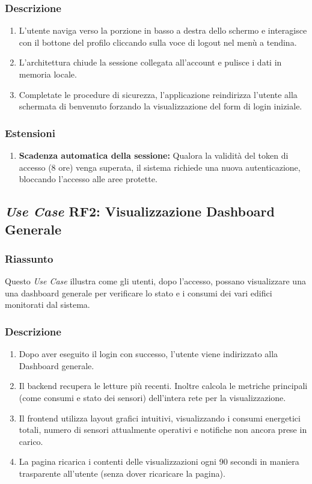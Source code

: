         \subsubsection*{Descrizione}
            \begin{enumerate}
                \item L'utente naviga verso la porzione in basso a  destra dello schermo e interagisce con il bottone del profilo cliccando sulla voce di logout nel menù a tendina.
                \item L'architettura chiude la sessione collegata all'account e pulisce i dati in memoria locale.
                \item Completate le procedure di sicurezza, l'applicazione reindirizza l'utente alla schermata di benvenuto forzando la visualizzazione del form di login iniziale.
            \end{enumerate}
        \subsubsection*{Estensioni}
            \begin{enumerate}
                \item \textbf{Scadenza automatica della sessione:} Qualora la validità del token di accesso (8 ore) venga superata, il sistema richiede una nuova autenticazione, bloccando l'accesso alle aree protette.
            \end{enumerate}
    \subsection*{\textit{Use Case} RF2: Visualizzazione Dashboard Generale}
        \subsubsection*{Riassunto}
            Questo \textit{Use Case} illustra come gli utenti, dopo l'accesso, possano visualizzare una una dashboard generale per verificare lo stato e i consumi dei vari edifici monitorati dal sistema.
        \subsubsection*{Descrizione}
            \begin{enumerate}
                \item Dopo aver eseguito il login con successo, l'utente viene indirizzato alla Dashboard generale.
                \item Il backend recupera le letture più recenti. Inoltre calcola le metriche principali (come consumi e stato dei sensori) dell'intera rete per la visualizzazione.
                \item Il frontend utilizza layout grafici intuitivi, visualizzando i consumi energetici totali, numero di sensori attualmente operativi e notifiche non ancora prese in carico.
                \item La pagina ricarica i contenti delle visualizzazioni ogni 90 secondi in maniera trasparente all'utente (senza dover ricaricare la pagina).
            \end{enumerate}
